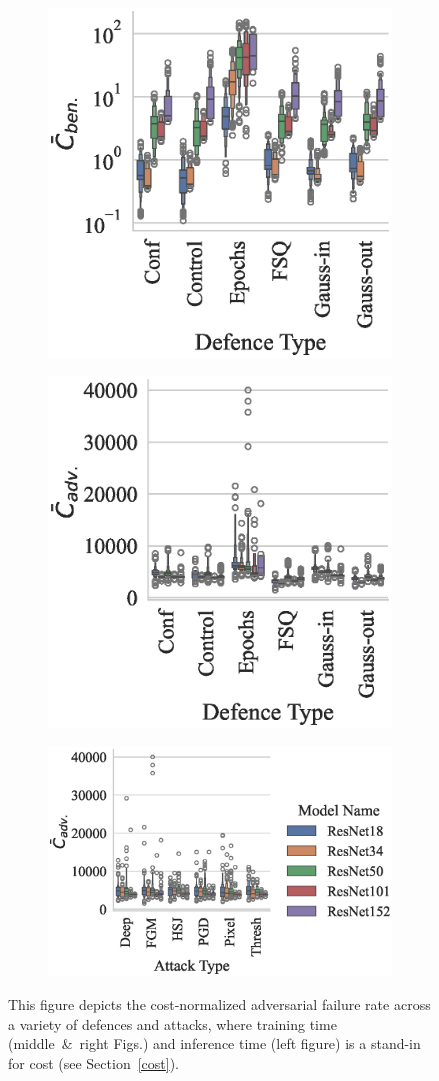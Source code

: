 \begin{figure}[!h]
    \centering
    \begin{subfigure}
        \centering
        \includegraphics[trim={5pt 5pt 5pt 10pt},clip,width=.29\textwidth]{cifar/ben_failures_per_train_time_vs_defence_type.eps}
    \end{subfigure}
    \begin{subfigure}
        \centering
        \includegraphics[trim={5pt 5pt 5pt 10pt},clip,width=.29\textwidth]{cifar/adv_failures_per_train_time_vs_defence_type.eps}
    \end{subfigure}
    \begin{subfigure}
        \centering
        \includegraphics[trim={5pt 5pt 20pt 10pt},clip,width=.4\textwidth]{cifar/adv_failures_per_train_time_vs_attack_type.eps}
    \end{subfigure}
    \caption{This figure depicts the cost-normalized adversarial failure rate across a variety of defences and attacks, where training time (middle~\&~right Figs.) and inference time (left figure) is a stand-in for cost (see Section~\ref{cost}).}
    \label{fig:cifar_failures_per_train_time}
\end{figure}

